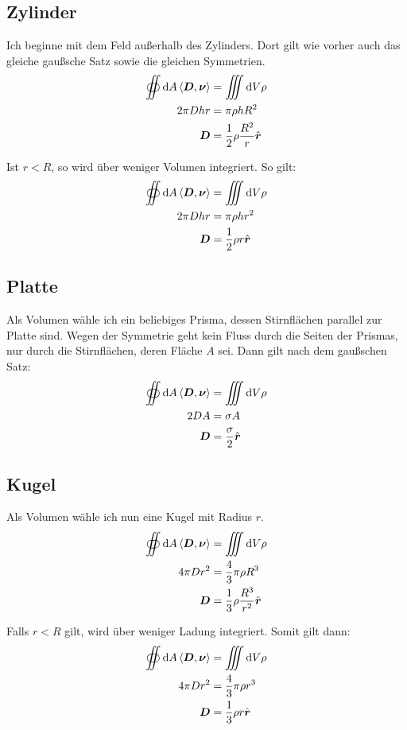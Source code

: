 \documentclass[11pt, ngerman]{article}
\newcommand{\inner}[2]{\left\langle #1, #2 \right\rangle}
\renewcommand{\vec}[1]{\boldsymbol{#1}}
\begin{document}
\subsection{Zylinder}

Ich beginne mit dem Feld außerhalb des Zylinders. Dort gilt wie vorher auch das gleiche gaußsche Satz sowie die gleichen Symmetrien.
%
\begin{align*}
	\oiint \dif A \inner{\vec D}{\vec \nu} &= \iiint \dif V \rho \\
				  2 \pi D h r &= \pi \rho h R^2 \\
									  \vec D &= \frac 12 \rho \frac {R^2}r \hat{\vec r}
\end{align*}

Ist $r < R$, so wird über weniger Volumen integriert. So gilt:
\begin{align*}
	\oiint \dif A \inner{\vec D}{\vec \nu} &= \iiint \dif V \rho \\
				  2 \pi D h r &= \pi \rho h r^2 \\
									  \vec D &= \frac 12 \rho r \hat{\vec r}
\end{align*}

\subsection{Platte}

Als Volumen wähle ich ein beliebiges Prisma, dessen Stirnflächen parallel zur
Platte sind. Wegen der Symmetrie geht kein Fluss durch die Seiten der Prismas,
nur durch die Stirnflächen, deren Fläche $A$ sei. Dann gilt nach dem gaußschen Satz:
%
\begin{align*}
	\oiint \dif A \inner{\vec D}{\vec \nu} &= \iiint \dif V \rho \\
	2 D A &= \sigma A \\
   \vec D &= \frac{\sigma}2 \hat{\vec r}
\end{align*}

\subsection{Kugel}

Als Volumen wähle ich nun eine Kugel mit Radius $r$.
%
\begin{align*}
	\oiint \dif A \inner{\vec D}{\vec \nu} &= \iiint \dif V \rho \\
	4 \pi D r^2 &= \frac 43 \pi \rho R^3 \\
						\vec D &= \frac 13 \rho \frac{R^3}{r^2} \hat{\vec r}
\end{align*}

Falls $r < R$ gilt, wird über weniger Ladung integriert. Somit gilt dann:
%
\begin{align*}
	\oiint \dif A \inner{\vec D}{\vec \nu} &= \iiint \dif V \rho \\
	4 \pi D r^2 &= \frac 43 \pi \rho r^3 \\
						\vec D &= \frac 13 \rho r \hat{\vec r}
\end{align*}
\end{document}
